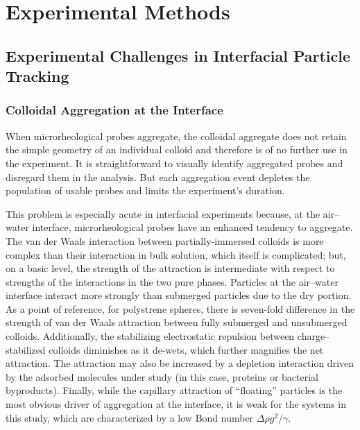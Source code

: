 \chapter{\label{chap:methods}Experimental Methods}

\section{Experimental Challenges in Interfacial Particle Tracking}

\subsection{Colloidal Aggregation at the Interface}

When microrheological probes aggregate, the colloidal aggregate does not retain the simple geometry of an individual colloid and therefore is of no further use in the experiment. It is straightforward to visually identify aggregated probes and disregard them in the analysis. But each aggregation event depletes the population of usable probes and limits the experiment's duration.

This problem is especially acute in interfacial experiments because, at the air--water interface, microrheological probes have an enhanced tendency to aggregate. The van der Waals interaction between partially-immersed colloids is more complex than their interaction in bulk solution, which itself is complicated\cite{Crocker1994}; but, on a basic level, the strength of the attraction is intermediate with respect to strengths of the interactions in the two pure phases. Particles at the air--water interface interact more strongly than submerged particles due to the dry portion. As a point of reference, for polystrene spheres, there is seven-fold difference in the strength of van der Waals attraction between fully submerged and unsubmerged colloids\cite{Williams1991}. Additionally, the stabilizing electrostatic repulsion between charge--stabilized colloids diminishes as it de-wets, which further magnifies the net attraction\cite{Williams1991,Lyne1989}. The attraction may also be increased by a depletion interaction driven by the adsorbed molecules under study (in this case, proteins or bacterial byproducts). Finally, while the capillary attraction of ``floating'' particles is the most obvious driver of aggregation at the interface, it is weak for the systems in this study, which are characterized by a low Bond number $\Delta\rho g^2/\gamma$.

